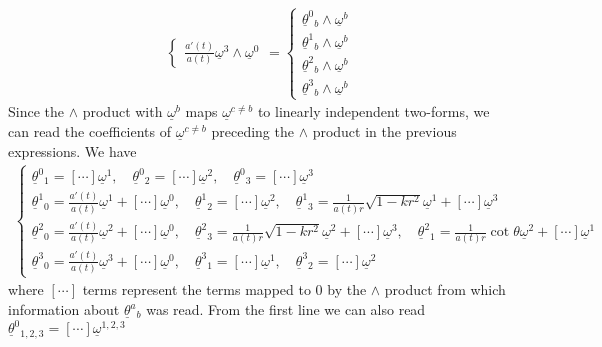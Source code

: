\documentclass[10pt, a4paper]{article}
\begin{document}
{\begin{enumerate}
\begin{align*}
\begin{cases}
     \frac{a'(t)}{a(t)}\underline{\omega}^3 \wedge \underline{\omega}^0
    \end{cases} 
    = \begin{cases}
      \underline{\theta}^0{ }_b \wedge \underline{\omega}^b \\
      \underline{\theta}^1{ }_b \wedge \underline{\omega}^b \\
      \underline{\theta}^2{ }_b \wedge \underline{\omega}^b \\
      \underline{\theta}^3{ }_b \wedge \underline{\omega}^b 
    \end{cases}
  \end{align*}
  Since the $\wedge$ product with $\underline{\omega}^b$ maps $\underline{\omega}^{c\neq b}$ to linearly independent two-forms, we can read the coefficients of $\underline{\omega}^{c\neq b}$ preceding the $\wedge$ product in the previous expressions. We have
  \begin{align*}
    \begin{cases}
    \underline{\theta}^0{ }_{1} =  [\cdots] \underline{\omega}^1, \quad \underline{\theta}^0{ }_{2} =  [\cdots] \underline{\omega}^2, \quad \underline{\theta}^0{ }_{3} =  [\cdots] \underline{\omega}^3\\
    \underline{\theta}^1{ }_0 = \frac{a'(t)}{a(t)}\underline{\omega}^1 + [\cdots] \underline{\omega}^0,\quad \underline{\theta}^1{ }_{2} = [\cdots] \underline{\omega}^2, \quad \underline{\theta}^1{ }_3 = \frac{1}{a(t)r}\sqrt{1-k r^2}\underline{\omega}^1 + [\cdots] \underline{\omega}^3\\
    \underline{\theta}^2{ }_0 = \frac{a'(t)}{a(t)}\underline{\omega}^2 + [\cdots]\underline{\omega}^0,\quad \underline{\theta}^2{ }_3 = \frac{1}{a(t)r}\sqrt{1-k r^2}\underline{\omega}^2 + [\cdots]\underline{\omega}^3,\quad \underline{\theta}^2{ }_1 = \frac{1}{a(t)r}\cot \theta \underline{\omega}^2 + [\cdots]\underline{\omega}^1\\
    \underline{\theta}^3{ }_0 = \frac{a'(t)}{a(t)}\underline{\omega}^3 + [\cdots]\underline{\omega}^0,\quad \underline{\theta}^3{ }_1 = [\cdots]\underline{\omega}^1, \quad \underline{\theta}^3{ }_2 = [\cdots]\underline{\omega}^2
    \end{cases}
  \end{align*} 
  where $[\cdots]$ terms represent the terms mapped to $0$ by the $\wedge$ product from which information about $\underline{\theta}^a{ }_b$ was read. From the first line we can also read $\underline{\theta}^0{ }_{1, 2, 3} = [\cdots] \underline{\omega}^{1, 2, 3}$
  

\end{enumerate}}
\end{document}
